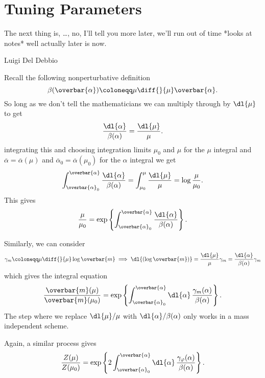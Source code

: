 \documentclass[fleqn]{NotesClass}
\begin{document}
    \section{Tuning Parameters}
    \epigraph{The next thing is, \ldots, no, I'll tell you more later, we'll run out of time *looks at notes* well actually later is now.}{Luigi Del Debbio}
    Recall the following nonperturbative definition
    \begin{equation}
        \beta(\overbar{\alpha}) \coloneqq \mu \diff{}{\mu} \overbar{\alpha}.
    \end{equation}
    So long as we don't tell the mathematicians we can multiply through by \(\dl{\mu}\) to get
    \begin{equation}
        \frac{\dl{\alpha}}{\beta(\alpha)} = \frac{\dl{\mu}}{\mu}.
    \end{equation}
    integrating this and choosing integration limits \(\mu_0\) and \(\mu\) for the \(\mu\) integral and \(\overbar{\alpha} = \overbar{\alpha}(\mu)\) and \(\overbar{\alpha}_0 = \overbar{\alpha}(\mu_0)\) for the \(\alpha\) integral we get
    \begin{equation}
        \int_{\overbar{\alpha}_0}^{\overbar{\alpha}} \frac{\dl{\alpha}}{\beta(\alpha)} = \int_{\mu_0}^{\mu} \frac{\dl{\mu}}{\mu} = \log\frac{\mu}{\mu_0}.
    \end{equation}
    This gives
    \begin{equation}
        \frac{\mu}{\mu_0} = \exp\left\{ \int_{\overbar{\alpha}_0}^{\overbar{\alpha}} \frac{\dl{\alpha}}{\beta(\alpha)} \right\}.
    \end{equation}
    
    Similarly, we can consider
    \begin{equation}
        \gamma_m \coloneqq \mu \diff{}{\mu} \log \overbar{m} \implies \dl{(\log \overbar{m})} = \frac{\dl{\mu}}{\mu} \gamma_m = \frac{\dl{\alpha}}{\beta(\alpha)} \gamma_m
    \end{equation}
    which gives the integral equation
    \begin{equation}
        \frac{\overbar{m}(\mu)}{\overbar{m}(\mu_0)} = \exp\left\{ \int_{\overbar{\alpha}_0}^{\overbar{\alpha}} \dl{\alpha} \, \frac{\gamma_m(\alpha)}{\beta(\alpha)} \right\}.
    \end{equation}
    The step where we replace \(\dl{\mu}/\mu\) with \(\dl{\alpha}/\beta(\alpha)\) only works in a mass independent scheme.
    
    Again, a similar process gives
    \begin{equation}
        \frac{Z(\mu)}{Z(\mu_0)} = \exp\left\{ 2 \int_{\overbar{\alpha}_0}^{\overbar{\alpha}} \dl{\alpha} \, \frac{\gamma_\varphi(\alpha)}{\beta(\alpha)} \right\}.
    \end{equation}
    
\end{document}
